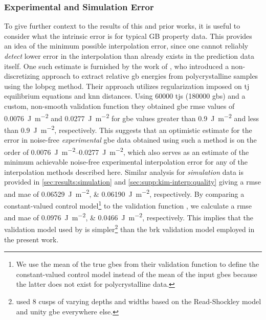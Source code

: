 \documentclass[final,twocolumn,12pt]{elsarticle}
\newcommand{\inpt}{input}
\newcommand{\outpt}{prediction}
\begin{document}
\subsubsection{Experimental and Simulation Error}
To give further context to the results of this and prior works, it is useful to consider what the intrinsic error is for typical GB property data. This provides an idea of the minimum possible interpolation error, since one cannot reliably \emph{detect} lower error in the interpolation than already exists in the \outpt{} data itself. One such estimate is furnished by the work of \citet{shenDeterminingGrainBoundary2019}, who introduced a non-discretizing approach to extract relative \gls{gb} energies from polycrystalline samples using the \gls{lobpcg} method. Their approach utilizes regularization imposed on \gls{tj} equilibrium equations and \gls{knn} distances. Using \num{60000} \glspl{tj} (\num{180000} \glspl{gb}) and a custom, non-smooth validation function they obtained \gls{gbe} \gls{rmse} values of \SI{0.0076}{\J\per\square\meter} and \SI{0.0277}{\J\per\square\meter} for \gls{gbe} values greater than \SI{0.9}{\J\per\square\meter} and less than \SI{0.9}{\J\per\square\meter}, respectively. This suggests that an optimistic estimate for the error in noise-free \emph{experimental} \gls{gbe} data obtained using such a method is on the order of \SIrange{0.0076}{0.0277}{\J\per\square\meter}, which also serves as an estimate of the minimum achievable noise-free experimental interpolation error for any of the interpolation methods described here. Similar analysis for \emph{simulation} data is provided in \cref{sec:results:simulation} and \cref{sec:supp:kim-interp:quality} giving a \gls{rmse} and \gls{mae} of \SIlist{0.06529;0.06190}{\joule\per\square\meter}, respectively. By comparing a constant-valued control model\footnote{We use the mean of the true \glspl{gbe} from their validation function to define the constant-valued control model instead of the mean of the \inpt{} \glspl{gbe} because the latter does not exist for polycrystalline data.} to the validation function \cite{shenDeterminingGrainBoundary2019}, we calculate a \gls{rmse} and \gls{mae} of \SIlist{0.0976;0.0466}{\joule\per\square\meter}, respectively. This implies that the validation model used by \citet{shenDeterminingGrainBoundary2019} is simpler\footnote{\citet{shenDeterminingGrainBoundary2019} used 8 cusps of varying depths and widths based on the Read-Shockley model and unity \gls{gbe} everywhere else.} than the \gls{brk} validation model employed in the present work.
\end{document}
